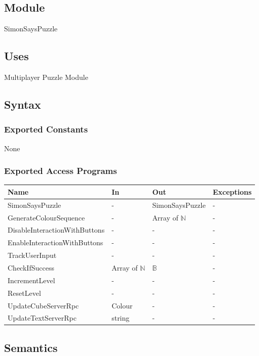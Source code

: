 \documentclass[12pt, titlepage]{article}
\begin{document}
\subsection{Module}
SimonSaysPuzzle

\subsection{Uses}
Multiplayer Puzzle Module

\subsection{Syntax}

\subsubsection{Exported Constants}
None

\subsubsection{Exported Access Programs}

\begin{center}
\begin{tabular}{p{5cm} p{4cm} p{4cm} p{2cm}}
\hline
\textbf{Name} & \textbf{In} & \textbf{Out} & \textbf{Exceptions} \\
\hline
SimonSaysPuzzle & - & SimonSaysPuzzle & -\\
GenerateColourSequence & - & Array of $\mathds{N}$ & - \\
DisableInteractionWithButtons & - & - & - \\
EnableInteractionWithButtons & - & - & - \\
TrackUserInput & - & - & - \\
CheckIfSuccess & Array of $\mathds{N}$ & $\mathds{B}$ & - \\
IncrementLevel & - & - & - \\
ResetLevel & - & - & - \\
UpdateCubeServerRpc & Colour & - & - \\
UpdateTextServerRpc & string & - & - \\
\hline
\end{tabular}
\end{center}

\subsection{Semantics}
\end{document}

